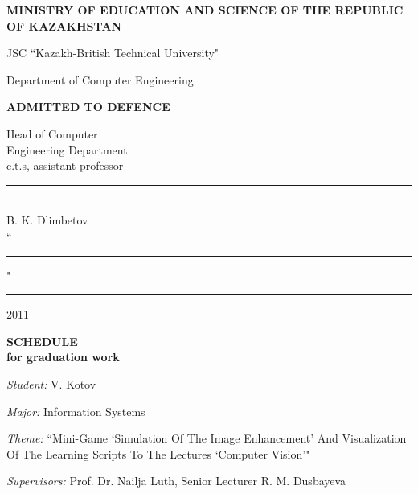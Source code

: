\documentclass[12pt]{article}
\begin{document}
	\pagebreak
	
	\begin{centering}
	{\bf{\MakeUppercase{Ministry of education and science of the republic of Kazakhstan}}

	\vspace{12pt}

	JSC ``Kazakh-British Technical University"

	Department of Computer Engineering}

	\begin{flushright}
		{\bf \MakeUppercase{Admitted to defence}}

		Head of Computer\\
		Engineering Department\\
		c.t.s, assistant professor\\
		\vspace{0.5\baselineskip}
		\rule{13em}{0.4pt}\\
		B. K. Dlimbetov\\
		\vspace{0.5\baselineskip}
		``\rule{2em}{0.4pt}" \rule{8em}{0.4pt} 2011\\
	\end{flushright}

	{\bf
	\MakeUppercase{Schedule}\\
	for graduation work}

	\vspace{12pt}
	\end{centering}
	
	\emph{Student:} V. Kotov

	\emph{Major:} Information Systems

	\emph{Theme:} ``Mini-Game `Simulation Of The Image Enhancement' And Visualization Of The Learning Scripts To The Lectures `Computer Vision'"
	
	\emph{Supervisors:} Prof. Dr. Nailja Luth, Senior Lecturer R. M. Dusbayeva
	
\end{document}
